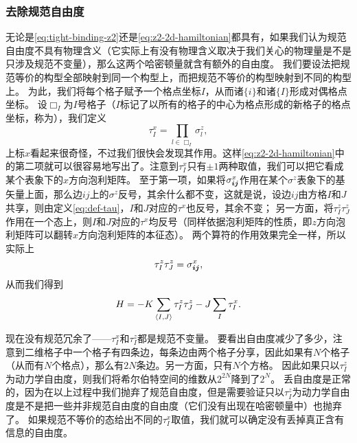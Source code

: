 \subsubsection{去除规范自由度}

无论是\eqref{eq:tight-binding-z2}还是\eqref{eq:z2-2d-hamiltonian}都具有，如果我们认为规范自由度不具有物理含义（它实际上有没有物理含义取决于我们关心的物理量是不是只涉及规范不变量），那么这两个哈密顿量就含有额外的自由度。
我们要设法把规范等价的构型全部映射到同一个构型上，而把规范不等价的构型映射到不同的构型上。
为此，我们将每个格子赋予一个格点坐标$I$，从而诸$\{i\}$和诸$\{I\}$形成对偶格点坐标。
设$\Box_I$为$I$号格子（$I$标记了以所有的格子的中心为格点形成的新格子的格点坐标，称为），我们定义
\begin{equation}
    {\tau}^x_I = \prod_{l \in \Box_I} {\sigma}^z_l,
    \label{eq:def-tau}
\end{equation}
上标$x$看起来很奇怪，不过我们很快会发现其作用。这样\eqref{eq:z2-2d-hamiltonian}中的第二项就可以很容易地写出了。注意到$\tau^x_I$只有$\pm 1$两种取值，我们可以把它看成某个表象下的$x$方向泡利矩阵。
至于第一项，如果将${\sigma}_{\vb*{i} \vb*{j}}^x$作用在某个${\sigma}^z$表象下的基矢量上面，那么边$ij$上的$\sigma^z$反号，其余什么都不变，这就是说，设边$ij$由方格$I$和$J$共享，则由定义\eqref{eq:def-tau}，$I$和$J$对应的$\tau^x$也反号，其余不变；
另一方面，将${\tau}^z_I {\tau}^z_J$作用在一个态上，则$I$和$J$对应的$\tau^x$均反号（同样依据泡利矩阵的性质，即$z$方向泡利矩阵可以翻转$x$方向泡利矩阵的本征态）。
两个算符的作用效果完全一样，所以实际上
\begin{equation}
    {\tau}^z_I {\tau}^z_J = {\sigma}^x_{\vb*{i} \vb*{j}},
\end{equation}
从而我们得到
\begin{equation}
    {H} = - K \sum_{\langle I, J \rangle} {\tau}^z_I {\tau}^z_J - J \sum_{I} {\tau}^x_I.
    \label{eq:z2-2d-tau-hamiltonian}
\end{equation}

现在没有规范冗余了——${\tau}^x_{I}$和${\tau}^z_I$都是规范不变量。
要看出自由度减少了多少，注意到二维格子中一个格子有四条边，每条边由两个格子分享，因此如果有$N$个格子（从而有$N$个格点），那么有$2N$条边。另一方面，只有$N$个方格。
因此如果只以${\tau}^z_I$为动力学自由度，则我们将希尔伯特空间的维数从$2^{2N}$降到了$2^N$。
丢自由度是正常的，因为在以上过程中我们抛弃了规范自由度，但是需要验证只以${\tau}^z_I$为动力学自由度是不是把一些并非规范自由度的自由度（它们没有出现在哈密顿量中）也抛弃了。
如果规范不等价的态给出不同的${\tau}^x_I$取值，我们就可以确定没有丢掉真正含有信息的自由度。

